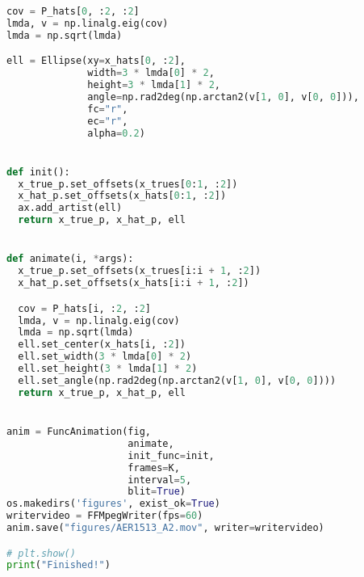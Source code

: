 \documentclass[a4paper]{article}
\begin{document}
\begin{lstlisting}[language=Python, basicstyle=\small]
cov = P_hats[0, :2, :2]
lmda, v = np.linalg.eig(cov)
lmda = np.sqrt(lmda)

ell = Ellipse(xy=x_hats[0, :2],
              width=3 * lmda[0] * 2,
              height=3 * lmda[1] * 2,
              angle=np.rad2deg(np.arctan2(v[1, 0], v[0, 0])),
              fc="r",
              ec="r",
              alpha=0.2)


def init():
  x_true_p.set_offsets(x_trues[0:1, :2])
  x_hat_p.set_offsets(x_hats[0:1, :2])
  ax.add_artist(ell)
  return x_true_p, x_hat_p, ell


def animate(i, *args):
  x_true_p.set_offsets(x_trues[i:i + 1, :2])
  x_hat_p.set_offsets(x_hats[i:i + 1, :2])

  cov = P_hats[i, :2, :2]
  lmda, v = np.linalg.eig(cov)
  lmda = np.sqrt(lmda)
  ell.set_center(x_hats[i, :2])
  ell.set_width(3 * lmda[0] * 2)
  ell.set_height(3 * lmda[1] * 2)
  ell.set_angle(np.rad2deg(np.arctan2(v[1, 0], v[0, 0])))
  return x_true_p, x_hat_p, ell


anim = FuncAnimation(fig,
                     animate,
                     init_func=init,
                     frames=K,
                     interval=5,
                     blit=True)
os.makedirs('figures', exist_ok=True)
writervideo = FFMpegWriter(fps=60)
anim.save("figures/AER1513_A2.mov", writer=writervideo)

# plt.show()
print("Finished!")
\end{lstlisting}
\end{document}
